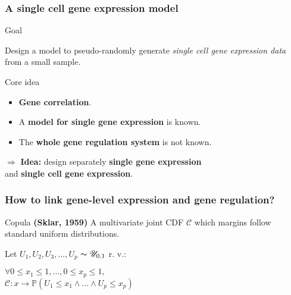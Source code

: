 \documentclass{beamer}
\begin{document}
\begin{frame}
\frametitle{A single cell gene expression model}

\begin{block}{Goal}
\begin{center}
Design a model to pseudo-randomly generate \textit{single cell gene expression data} from a small sample.
\end{center}
\end{block}

\pause

\begin{alertblock}{Core idea}
\begin{itemize}[<+>]
\item \textbf{Gene correlation}.
\item A \textbf{model for single gene expression} is known.
\item The \textbf{whole gene regulation system} is not known. 
\end{itemize}
\pause
\begin{flushcenter}
$\Rightarrow$ \textbf{Idea:} design separately \textbf{single gene expression}\\and \textbf{single cell gene expression}.
\end{flushcenter}
\end{alertblock}

\end{frame}

\begin{frame}
\frametitle{How to link gene-level expression and gene regulation?}

\begin{block}{Copula \textbf{(Sklar, 1959)}}
A multivariate joint CDF $\mathscr{C}$ which margins follow standard uniform distributions.
\pause
\bigskip

Let $U_1, U_2, U_3, ..., U_p$ $\thicksim \mathscr{U}_{0,1}$ r. v.: \\
\begin{center}
$\forall 0 \leq x_1 \leq 1, ..., 0 \leq x_p \leq 1,$\\$\mathscr{C} : x \rightarrow \mathbb{P}(U_1 \leq x_1 \land ... \land U_p \leq x_p)$
\end{center}
\end{block}

\end{frame}
\end{document}
